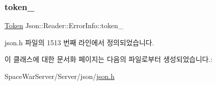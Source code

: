 \subsubsection{\texorpdfstring{token\+\_\+}{token\_}}
{\footnotesize\ttfamily \hyperlink{class_json_1_1_reader_1_1_token}{Token} Json\+::\+Reader\+::\+Error\+Info\+::token\+\_\+}



json.\+h 파일의 1513 번째 라인에서 정의되었습니다.



이 클래스에 대한 문서화 페이지는 다음의 파일로부터 생성되었습니다.\+:\begin{DoxyCompactItemize}
\item 
Space\+War\+Server/\+Server/json/\hyperlink{json_8h}{json.\+h}\end{DoxyCompactItemize}
